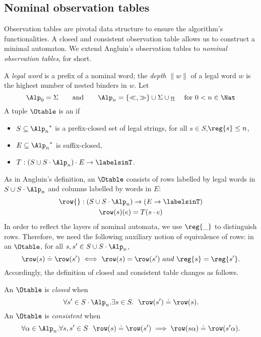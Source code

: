 \subsection{Nominal observation tables}
Observation tables are pivotal data structure to ensure the
algorithm's functionalities. A closed and consistent observation table
allows us to construct a minimal automaton.
%
We extend Angluin's observation tables to \emph{nominal observation
  tables}, \nOtable[s] for short.
\begin{definition}[\nOtable]\label{def:nOT}
A \emph{legal word} is a prefix of a nominal word; the \emph{depth}
  $\|w\|$ of a legal word $w$ is the highest number of nested binders
  in $w$.
  Let
  \[
    \Alp_0 = \Sigma
    \qquad\text{and}\qquad
    \Alp_n= \{\ll,\gg\} \cup \Sigma\cup \underline{n}
    \quad \text{ for } 0 < n \in \Nat
  \]
  A tuple $\Otable$ is an
  \emph{\nOtable} if
  \begin{itemize}
  \item{$S\subseteq {\Alp_n}^*$ is a prefix-closed set of legal strings, for all $s\in S$,$\reg{s}\leq n$, }
  \item{$E\subseteq {\Alp_n}^*$ is suffix-closed,}
  \item{$T:(S\cup S\cdot {\Alp_n})\cdot E\rightarrow \labelsinT$.}
  \end{itemize}
\end{definition}
As in Angluin's definition, an \nOtable $\Otable$ consists of rows
labelled by legal words in $S\cup S\cdot \Alp_n$ and columns labelled
by words in $E$:
\begin{gather*}
  \row {}:{}   (S\cup S\cdot \Alp_n) \to (E \to \labelsinT)\\
  \row(s)(e)= T(s\cdot e)
\end{gather*}
In order to reflect the layers of nominal automata, we use $\reg{\_}$ to distinguish rows. Therefore, we need the following auxiliary notion of equivalence of rows:
in an \nOtable $\Otable$, for all $ s, s'\in S\cup S\cdot \Alp_n$, $$\row(s)\doteq\row(s')\ \Longleftrightarrow\ \row(s)=\row(s')\  and\ \reg{s}=\reg{s'}.$$ 
Accordingly, the definition of closed and consistent table changes as follows.
\begin{definition}
  An \emph{\nOtable} $\Otable$ is \emph{closed} when
  $$\forall s'\in S\cdot {\Alp_n}.\exists s\in S.\ \ \row(s')\doteq\row(s).$$ 
  An \emph{\nOtable} $\Otable$ is \emph{consistent} when $$\forall \alpha\in {\Alp_n}.\forall s,s'\in S\ \ \row(s)\doteq\row(s')\implies \row(s\alpha)\doteq\row(s'\alpha). $$
\end{definition}
